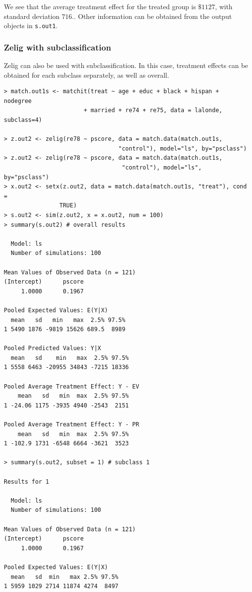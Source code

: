 \documentclass[oneside,letterpaper,titlepage]{article}
\begin{document}
We see that the average treatment effect for the treated group is $\$1127$, with standard deviation $716.$.  Other 
information can be obtained from the output objects in {\tt s.out1}.  

\subsubsection{Zelig with subclassification}
Zelig can also be used with subclassification.  In this case, treatment effects can be obtained for each subclass
separately, as well as overall.

\begin{verbatim}
> match.out1s <- matchit(treat ~ age + educ + black + hispan + nodegree
                       + married + re74 + re75, data = lalonde, subclass=4)

> z.out2 <- zelig(re78 ~ pscore, data = match.data(match.out1s,
                                 "control"), model="ls", by="psclass")
> z.out2 <- zelig(re78 ~ pscore, data = match.data(match.out1s,
                                  "control"), model="ls", by="psclass")
> x.out2 <- setx(z.out2, data = match.data(match.out1s, "treat"), cond =
                TRUE)
> s.out2 <- sim(z.out2, x = x.out2, num = 100)
> summary(s.out2) # overall results

  Model: ls 
  Number of simulations: 100 

Mean Values of Observed Data (n = 121) 
(Intercept)      pscore 
     1.0000      0.1967 

Pooled Expected Values: E(Y|X)
  mean   sd   min   max  2.5% 97.5%
1 5490 1876 -9819 15626 689.5  8989

Pooled Predicted Values: Y|X
  mean   sd    min   max  2.5% 97.5%
1 5558 6463 -20955 34843 -7215 18336

Pooled Average Treatment Effect: Y - EV
    mean   sd   min  max  2.5% 97.5%
1 -24.06 1175 -3935 4940 -2543  2151

Pooled Average Treatment Effect: Y - PR
    mean   sd   min  max  2.5% 97.5%
1 -102.9 1731 -6548 6664 -3621  3523

> summary(s.out2, subset = 1) # subclass 1

Results for 1 

  Model: ls 
  Number of simulations: 100 

Mean Values of Observed Data (n = 121) 
(Intercept)      pscore 
     1.0000      0.1967 

Pooled Expected Values: E(Y|X)
  mean   sd  min   max 2.5% 97.5%
1 5959 1029 2714 11874 4274  8497


\end{verbatim}
\end{document}
